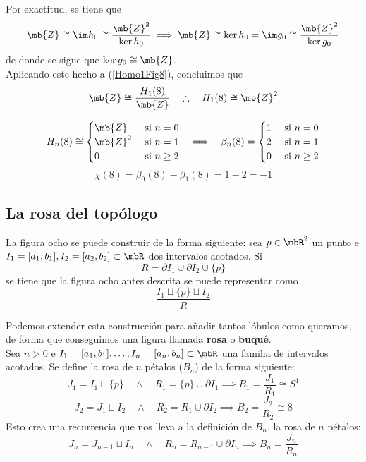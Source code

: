 Por exactitud, se tiene que
$$\mb{Z} \cong \im h_0 \cong \frac{\mb{Z}^2}{\ker h_0} \implies \mb{Z} \cong \ker h_0 = \im g_0 \cong \frac{\mb{Z}^2}{\ker g_0}$$ de donde se sigue que $\ker g_0\cong \mb{Z}$.
\\

Aplicando este hecho a (\ref{Homo1Fig8}), concluimos que $$\mb{Z} \cong \frac{H_1(8)}{\mb{Z}} \quad\therefore\quad H_1(8) \cong \mb{Z}^2$$

\begin{teo}\label{HomoOcho}
\[\begin{array}{ccc}
H_n(8)\cong
\begin{cases}
\mb{Z}		&\mbox{ si }n =0\\
\mb{Z}^2	&\mbox{ si }n =1\\
0     &\mbox{ si }n \geq 2
\end{cases}
&\implies&
\beta_n(8)=
\begin{cases}
1 &\mbox{ si }n = 0\\
2 &\mbox{ si }n = 1\\
0 &\mbox{ si }n \geq 2
\end{cases}
\end{array}\]
$$\chi(8)=\beta_0(8)-\beta_1(8)=1-2=-1$$
\end{teo}

\subsection{La rosa del topólogo}
La figura ocho se puede construir de la forma siguiente: sea $p \in \mbR^2$ un punto e $I_1=[a_1,b_1], I_2=[a_2,b_2] \subset \mbR$ dos intervalos acotados. Si \[R=\partial I_1\cup \partial I_2\cup \{p\}\] se tiene que la figura ocho antes descrita se puede representar como \[\frac{I_1\sqcup\{p\}\sqcup I_2}{R}\]

Podemos extender esta construcción para añadir tantos lóbulos como queramos, de forma que conseguimos una figura llamada \textbf{rosa} o \textbf{buqué}.
\\

Sea $n > 0$ e $I_1=[a_1,b_1], \dots, I_n=[a_n,b_n] \subset \mbR$ una familia de intervalos acotados. Se define la rosa de $n$ pétalos ($B_n$) de la forma siguiente:
\[J_1=I_1\sqcup \{p\} \quad\land\quad R_1=\{p\}\cup \partial I_1 \implies B_1=\frac{J_1}{R_1}\cong S^1\]
\[J_2=J_1 \sqcup I_2 \quad\land\quad R_2=R_1 \cup \partial I_2 \implies B_2=\frac{J_2}{R_2} \cong 8\]
Esto crea una recurrencia que nos lleva a la definición de $B_n$, la rosa de $n$ pétalos: \[J_n=J_{n-1}\sqcup I_n \quad\land\quad R_n=R_{n-1}\cup \partial I_n \implies B_n=\frac{J_n}{R_n}\]

